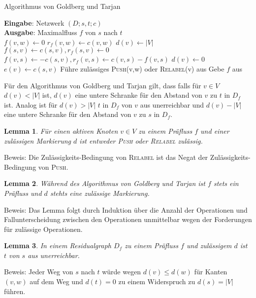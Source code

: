 \documentclass[a4paper,10pt]{scrartcl}
\newcommand{\tbf}{\textbf}
\newcommand{\tsc}{\textsc}
\newcommand{\agn}{\leftarrow}
\newcommand{\Nw}{$(D;s,t;c)$ }
\newcommand{\Eingabe}[1]{\STATE \tbf{Eingabe}: #1 \\}
\newcommand{\Ausgabe}[1]{\STATE \tbf{Ausgabe}: #1 \\}
\newtheorem{lemma}{Lemma}
\begin{document}
\begin{algorithm}
\caption{Algorithmus von \textsf{Goldberg} und \textsf{Tarjan}}
\begin{algorithmic}
\Eingabe{Netzwerk \Nw}
\Ausgabe{Maximalfluss $f$ von $s$ nach $t$}
	\STATE $f(v,w) \agn 0$
	\STATE $r_f(v,w) \agn c(v,w)$
\ENDFOR
\STATE $d(v) \agn |V|$
	\STATE $f(s,v) \agn c(s,v), r_f(s,v) \agn 0$
	\STATE $f(v,s) \agn -c(s,v), r_f(v,s) \agn c(v,s) - f(v,s)$
	\STATE $d(v) \agn 0$
	\STATE $e(v) \agn c(s,v)$
\ENDFOR
{}
	\STATE Führe zulässiges \tsc{Push}(v,w) oder \tsc{Relabel}(v) aus
\ENDWHILE
\STATE Gebe $f$ aus
\end{algorithmic}
\end{algorithm}

Für den Algorithmus von \textsf{Goldberg} und \textsf{Tarjan} gilt, dass falls für $v \in V$ $d(v) < |V|$ ist, $d(v)$ eine untere Schranke für den Abstand von $v$ zu $t$ in $D_f$ ist. Analog ist für $d(v) > |V|$ $t$ in $D_f$ von $v$ aus unerreichbar und $d(v) - |V|$ eine untere Schranke für den Abstand von $v$ zu $s$ in $D_f$. \\

\begin{lemma}\label{PushXORRelabel} 
 Für einen aktiven Knoten $v \in V$ zu einem Präfluss $f$ und einer zulässigen Markierung $d$ ist entweder \tsc{Push} oder \tsc{Relabel} zulässig.
\end{lemma}

Beweis: Die Zulässigkeits-Bedingung von \tsc{Relabel} ist das Negat der Zulässigkeits-Bedingung von \tsc{Push}.

\begin{lemma}
 Während des Algorithmus von \textsf{Goldberg} und \textsf{Tarjan} ist $f$ stets ein Präfluss und $d$ stehts eine zulässige Markierung.
\end{lemma}

Beweis: Das Lemma folgt durch Induktion über die Anzahl der Operationen und Fallunterscheidung zwischen den Operationen unmittelbar wegen der Forderungen für zulässige Operationen. \\

\begin{lemma}\label{keinSTWeg}
 In einem Residualgraph $D_f$ zu einem Präfluss $f$ und zulässigem $d$ ist $t$ von $s$ aus unerreichbar.
\end{lemma}

Beweis: Jeder Weg von $s$ nach $t$ würde wegen $d(v) \leq d(w)$ für Kanten $(v,w)$ auf dem Weg und $d(t) = 0$ zu einem Widerspruch zu $d(s) = |V|$ führen.
\end{document}
